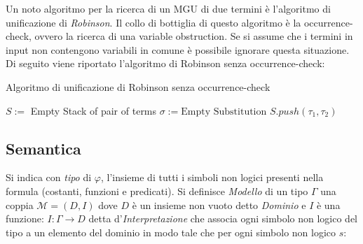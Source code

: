 \documentclass[./main.tex]{subfiles}
\begin{document}
Un noto algoritmo per la ricerca di un MGU di due termini è l'algoritmo di unificazione di \textit{Robinson}. Il collo di bottiglia di questo 
algoritmo è la occurrence-check, ovvero la ricerca di una variable obstruction. Se si assume che i termini in 
input non contengono variabili in comune è possibile ignorare questa situazione. Di seguito viene riportato l'algoritmo di Robinson
senza occurrence-check:

\begin{algorithm}[H]
  \caption{Algoritmo di unificazione di Robinson senza occurrence-check}


  $S :=$ Empty Stack of pair of terms\;
  $\sigma := \text{Empty Substitution}$\;
  \BlankLine
  $S.push(\tau_1, \tau_2)$\;

  \Return{$\sigma$}\;
\end{algorithm}



\subsection{Semantica} \label{sec:semantica_fof}
Si indica con \textit{tipo} di $\varphi$, l'insieme di tutti i simboli non logici presenti nella formula (costanti, funzioni e predicati).
Si definisce \textit{Modello} di un tipo $\Gamma$ una coppia $\mathcal{M} = (D, I)$ dove $D$ è un insieme non vuoto detto \textit{Dominio} e $I$ è una funzione: 
$I: \Gamma \rightarrow D$ detta d'\textit{Interpretazione} che associa ogni simbolo non logico del tipo a un elemento del dominio in modo tale che per ogni simbolo non logico $s$:
\end{document}
